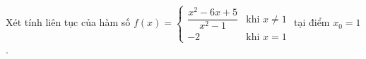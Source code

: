 \begin{ex}
Xét tính liên tục của hàm số $f(x)=\begin{cases}\dfrac{x^2-6x+5}{x^2-1}&\text{khi }x\ne1\\-2&\text{khi }x=1\end{cases}$ tại điểm $x_0=1$.
\end{ex}
